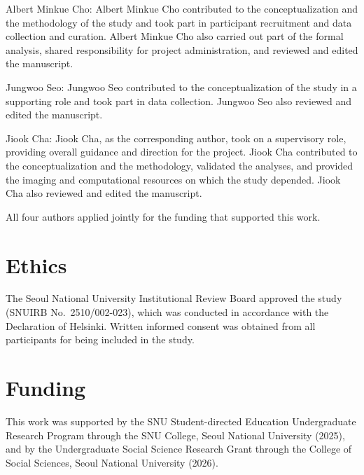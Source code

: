 \documentclass{imag-ms-template}
\begin{document}
Albert Minkue Cho: Albert Minkue Cho contributed to the conceptualization and the
methodology of the study and took part in participant recruitment and data
collection and curation. Albert Minkue Cho also carried out part of the formal
analysis, shared responsibility for project administration, and reviewed and
edited the manuscript.

Jungwoo Seo: Jungwoo Seo contributed to the conceptualization of the study in a
supporting role and took part in data collection. Jungwoo Seo also reviewed and
edited the manuscript.

Jiook Cha: Jiook Cha, as the corresponding author, took on a supervisory role,
providing overall guidance and direction for the project. Jiook Cha contributed
to the conceptualization and the methodology, validated the analyses, and
provided the imaging and computational resources on which the study depended.
Jiook Cha also reviewed and edited the manuscript.

All four authors applied jointly for the funding that supported this work.

\section*{Ethics}

The Seoul National University Institutional Review Board approved the study
(SNUIRB No.~2510/002-023), which was conducted in accordance with the
Declaration of Helsinki. Written informed consent was obtained from all
participants for being included in the study.

\section*{Funding}

This work was supported by the SNU Student-directed Education Undergraduate
Research Program through the SNU College, Seoul National University (2025), and
by the Undergraduate Social Science Research Grant through the College of Social
Sciences, Seoul National University (2026).
\end{document}
